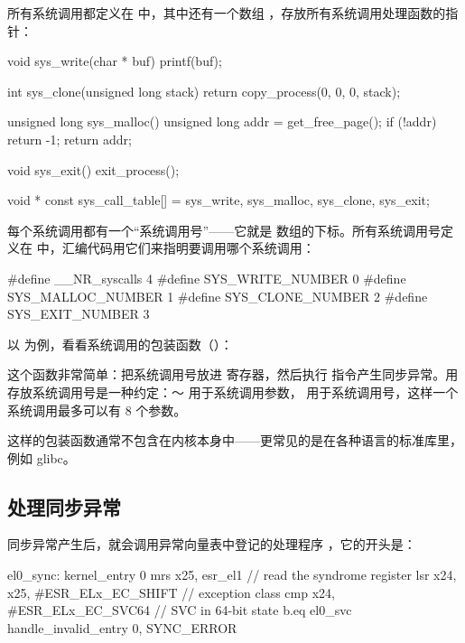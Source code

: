 所有系统调用都定义在  中，其中还有一个数组 ，存放所有系统调用处理函数的指针：

\begin{ccode}
void sys_write(char * buf){
	printf(buf);
}

int sys_clone(unsigned long stack){
	return copy_process(0, 0, 0, stack);
}

unsigned long sys_malloc(){
	unsigned long addr = get_free_page();
	if (!addr) {
		return -1;
	}
	return addr;
}

void sys_exit(){
	exit_process();
}

void * const sys_call_table[] = {sys_write, sys_malloc, sys_clone, sys_exit};
\end{ccode}

每个系统调用都有一个“系统调用号”——它就是  数组的下标。所有系统调用号定义在  中，汇编代码用它们来指明要调用哪个系统调用：

\begin{ccode}
#define __NR_syscalls	    4
#define SYS_WRITE_NUMBER    0
#define SYS_MALLOC_NUMBER   1
#define SYS_CLONE_NUMBER    2
#define SYS_EXIT_NUMBER     3
\end{ccode}

以  为例，看看系统调用的包装函数（）：


这个函数非常简单：把系统调用号放进  寄存器，然后执行  指令产生同步异常。用  存放系统调用号是一种约定：～ 用于系统调用参数， 用于系统调用号，这样一个系统调用最多可以有 8 个参数。

这样的包装函数通常不包含在内核本身中——更常见的是在各种语言的标准库里，例如 glibc。

\subsection{处理同步异常}

同步异常产生后，就会调用异常向量表中登记的处理程序 ，它的开头是：

\begin{asmcode}
el0_sync:
	kernel_entry 0
	mrs	x25, esr_el1				// read the syndrome register
	lsr	x24, x25, #ESR_ELx_EC_SHIFT		// exception class
	cmp	x24, #ESR_ELx_EC_SVC64			// SVC in 64-bit state
	b.eq	el0_svc
	handle_invalid_entry 0, SYNC_ERROR
\end{asmcode}

